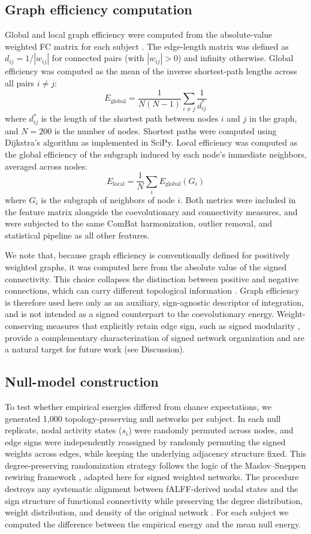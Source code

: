 \documentclass[10pt,letterpaper]{article}
\begin{document}
\subsection*{Graph efficiency computation}
Global and local graph efficiency were computed from the absolute-value weighted FC matrix for each
subject \cite{Latora2001,Fornito2016}. The edge-length matrix was defined as $d_{ij} = 1 /
|w_{ij}|$ for connected pairs (with $|w_{ij}| > 0$) and infinity otherwise. Global efficiency was
computed as the mean of the inverse shortest-path lengths across all pairs $i \neq j$:
\[
E_{\mathrm{global}} = \frac{1}{N(N-1)} \sum_{i \neq j} \frac{1}{d_{ij}^*}
\]
where $d_{ij}^*$ is the length of the shortest path between nodes $i$ and $j$ in the graph, and
$N = 200$ is the number of nodes. Shortest paths were computed using Dijkstra's algorithm as
implemented in SciPy. Local efficiency was computed as the global efficiency of the subgraph
induced by each node's immediate neighbors, averaged across nodes:
\[
E_{\mathrm{local}} = \frac{1}{N} \sum_i E_{\mathrm{global}}(G_i)
\]
where $G_i$ is the subgraph of neighbors of node $i$. Both metrics were included in the feature
matrix alongside the coevolutionary and connectivity measures, and were subjected to the same
ComBat harmonization, outlier removal, and statistical pipeline as all other features.

We note that, because graph efficiency is conventionally defined for positively weighted graphs,
it was computed here from the absolute value of the signed connectivity. This choice collapses the
distinction between positive and negative connections, which can carry different topological
information \cite{RubinovSporns2011}. Graph efficiency is therefore used here only as an auxiliary,
sign-agnostic descriptor of integration, and is not intended as a signed counterpart to the
coevolutionary energy. Weight-conserving measures that explicitly retain edge sign, such as signed
modularity \cite{RubinovSporns2011}, provide a complementary characterization of signed network
organization and are a natural target for future work (see Discussion).

\subsection*{Null-model construction}
To test whether empirical energies differed from chance expectations, we generated 1,000
topology-preserving null networks per subject. In each null replicate, nodal activity states
($s_i$) were randomly permuted across nodes, and edge signs were independently reassigned by
randomly permuting the signed weights across edges, while keeping the underlying adjacency structure
fixed. This degree-preserving randomization strategy follows the logic of the Maslov--Sneppen
rewiring framework \cite{Maslov2002}, adapted here for signed weighted networks. The procedure
destroys any systematic alignment between fALFF-derived nodal states and the sign structure of
functional connectivity while preserving the degree distribution, weight distribution, and density
of the original network \cite{Rubinov2010}. For each subject we computed the difference between
the empirical energy and the mean null energy.
\end{document}
